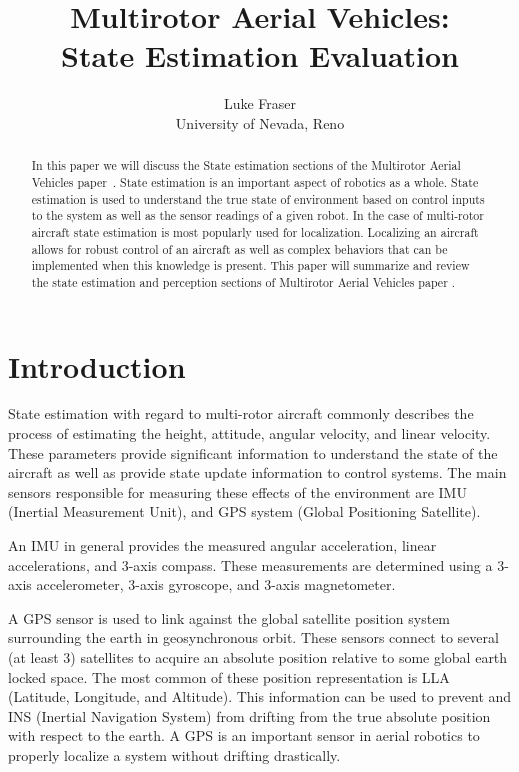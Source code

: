 \documentclass[conference]{IEEEtran}
\title{Multirotor Aerial Vehicles:\\State Estimation Evaluation}
\author{Luke Fraser\\
University of Nevada, Reno}
\begin{document}
\maketitle

\begin{abstract}
In this paper we will discuss the State estimation sections of the Multirotor Aerial Vehicles paper~\cite{6289431}. State estimation is an important aspect of robotics as a whole. State estimation is used to understand the true state of environment based on control inputs to the system as well as the sensor readings of a given robot. In the case of multi-rotor aircraft state estimation is most popularly used for localization. Localizing an aircraft allows for robust control of an aircraft as well as complex behaviors that can be implemented when this knowledge is present. This paper will summarize and review the state estimation and perception sections of Multirotor Aerial Vehicles paper \cite{6289431}.
\end{abstract}

\section{Introduction}
State estimation with regard to multi-rotor aircraft commonly describes the process of estimating the height, attitude, angular velocity, and linear velocity. These parameters provide significant information to understand the state of the aircraft as well as provide state update information to control systems. The main sensors responsible for measuring these effects of the environment are IMU (Inertial Measurement Unit), and GPS system (Global Positioning Satellite).

An IMU in general provides the measured angular acceleration, linear accelerations, and 3-axis compass. These measurements are determined using a 3-axis accelerometer, 3-axis gyroscope, and 3-axis magnetometer.

A GPS sensor is used to link against the global satellite position system surrounding the earth in geosynchronous orbit. These sensors connect to several (at least 3) satellites to acquire an absolute position relative to some global earth locked space. The most common of these position representation is LLA (Latitude, Longitude, and Altitude). This information can be used to prevent and INS (Inertial Navigation System) from drifting from the true absolute position with respect to the earth. A GPS is an important sensor in aerial robotics to properly localize a system without drifting drastically.
\end{document}
